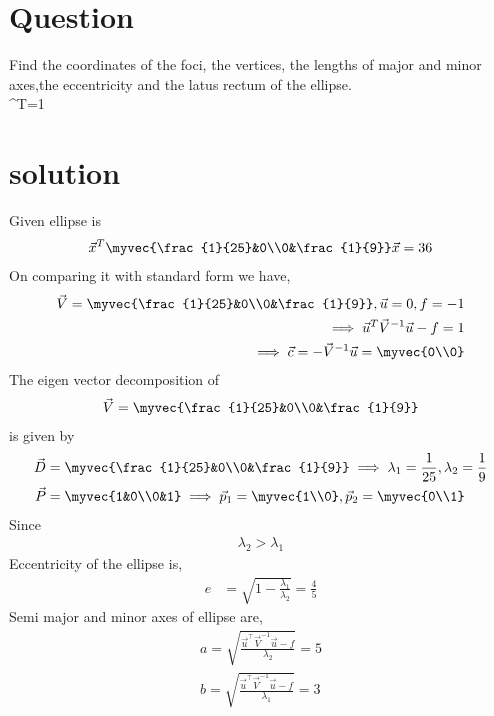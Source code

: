 \documentclass[journal,12pt,twocolumn]{IEEEtran}
\begin{document}
\section{Question}
Find the coordinates of the foci, the vertices,
the lengths of major and minor axes,the
eccentricity and the latus rectum of the  ellipse.\\
^T=1 
\section{solution}
%
Given ellipse is
\begin{align}
   \vec{x}^T\myvec{\frac{1}{25}&0\\0&\frac{1}{9}}\vec{x}=36
\end{align}
%
On comparing it with standard form we have,
\begin{align}
    \vec{V}=\myvec{\frac{1}{25}&0\\0&\frac{1}{9}},\vec{u}=0,f=-1\\
    \implies\vec{u}^T\vec{V}^{-1}\vec{u}-f = 1\\
    \implies\vec{c} = -\vec{V}^{-1}\vec{u} = \myvec{0\\0}\\
\end{align}
The eigen vector decomposition of 
\begin{align}
    \vec{V} = \myvec{\frac{1}{25}&0\\0&\frac{1}{9}}
\end{align}
is given by
\begin{align}
    \vec{D} &= \myvec{\frac{1}{25}&0\\0&\frac{1}{9}} \implies \lambda_1 = \frac{1}{25},\lambda_2 = \frac{1}{9}\\
    \vec{P} &= \myvec{1&0\\0&1}\implies \vec{p}_1 = \myvec{1\\0}, \vec{p}_2 = \myvec{0\\1}
\end{align}
Since
\begin{align}
   \lambda_2 > \lambda_1
\end{align}
Eccentricity of the ellipse is,
\begin{align}
   e &= \sqrt{1-\frac{\lambda_1}{\lambda_2}}
   = \frac{4}{5}
\end{align} 
Semi major and minor axes of ellipse are,
\begin{align}
    a = \sqrt{\frac{\vec{u}^{\top}\vec{V}^{-1}\vec{u}-f}{\lambda_2}} = 5\\ 
    b = \sqrt{\frac{\vec{u}^{\top}\vec{V}^{-1}\vec{u}-f}{\lambda_1}} = 3
\end{align}
\end{document}
